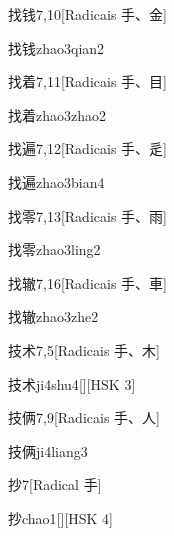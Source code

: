 \begin{entry}{找钱}{7,10}[Radicais ⼿、⾦]
  \begin{phonetics}{找钱}{zhao3qian2}
  \end{phonetics}
\end{entry}

\begin{entry}{找着}{7,11}[Radicais ⼿、⽬]
  \begin{phonetics}{找着}{zhao3zhao2}
  \end{phonetics}
\end{entry}

\begin{entry}{找遍}{7,12}[Radicais ⼿、⾡]
  \begin{phonetics}{找遍}{zhao3bian4}
  \end{phonetics}
\end{entry}

\begin{entry}{找零}{7,13}[Radicais ⼿、⾬]
  \begin{phonetics}{找零}{zhao3ling2}
  \end{phonetics}
\end{entry}

\begin{entry}{找辙}{7,16}[Radicais ⼿、⾞]
  \begin{phonetics}{找辙}{zhao3zhe2}
  \end{phonetics}
\end{entry}

\begin{entry}{技术}{7,5}[Radicais ⼿、⽊]
  \begin{phonetics}{技术}{ji4shu4}[][HSK 3]
  \end{phonetics}
\end{entry}

\begin{entry}{技俩}{7,9}[Radicais ⼿、⼈]
  \begin{phonetics}{技俩}{ji4liang3}
  \end{phonetics}
\end{entry}

\begin{entry}{抄}{7}[Radical ⼿]
  \begin{phonetics}{抄}{chao1}[][HSK 4]
  \end{phonetics}
\end{entry}

